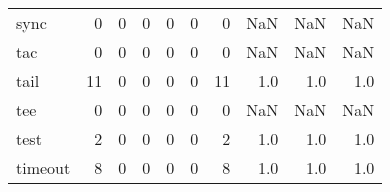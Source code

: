 \begin{tabular}{lrrrrrrrrr}
sync      &                                       0 &                                                  0 &                                                  0 &                                                  0 &                                                  0 &                                                  0 &                                                NaN &                                    NaN &                                  NaN \\
tac       &                                       0 &                                                  0 &                                                  0 &                                                  0 &                                                  0 &                                                  0 &                                                NaN &                                    NaN &                                  NaN \\
tail      &                                      11 &                                                  0 &                                                  0 &                                                  0 &                                                  0 &                                                 11 &                                                1.0 &                                    1.0 &                                  1.0 \\
tee       &                                       0 &                                                  0 &                                                  0 &                                                  0 &                                                  0 &                                                  0 &                                                NaN &                                    NaN &                                  NaN \\
test      &                                       2 &                                                  0 &                                                  0 &                                                  0 &                                                  0 &                                                  2 &                                                1.0 &                                    1.0 &                                  1.0 \\
timeout   &                                       8 &                                                  0 &                                                  0 &                                                  0 &                                                  0 &                                                  8 &                                                1.0 &                                    1.0 &                                  1.0 \\

\end{tabular}
